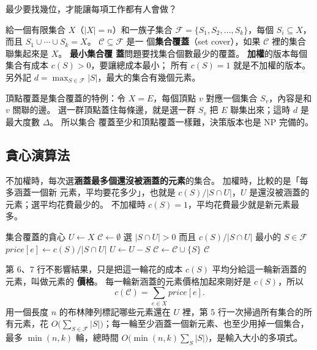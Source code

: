最少要找幾位，才能讓每項工作都有人會做？

\begin{definition}[集合覆蓋]
\label{def:apx-sc}
給一個有限集合 $X$（$|X| = n$）和一族子集合 $\mathcal{F} = \{S_1, S_2, \ldots, S_k\}$，每個
$S_i \subseteq X$，而且 $S_1 \cup \cdots \cup S_k = X$。 $\mathcal{C} \subseteq \mathcal{F}$ 是一
個\textbf{集合覆蓋}（set cover），如果 $\mathcal{C}$ 裡的集合聯集起來是 $X$。 \textbf{最小集合覆
蓋}問題要找集合個數最少的覆蓋。 \textbf{加權}的版本每個集合有成本 $c(S) > 0$，要讓總成本最小；
所有 $c(S) = 1$ 就是不加權的版本。 另外記 $d = \max_{S \in \mathcal{F}} |S|$，最大的集合有幾個元素。
\end{definition}

頂點覆蓋是集合覆蓋的特例：令 $X = E$，每個頂點 $v$ 對應一個集合 $S_v$，內容是和 $v$ 關聯的邊。
選一群頂點蓋住每條邊，就是選一群 $S_v$ 把 $E$ 聯集出來；這時 $d$ 是最大度數 $\Delta$。 所以集合
覆蓋至少和頂點覆蓋一樣難，決策版本也是 NP 完備的。

\subsection{貪心演算法}

不加權時，每次選\textbf{涵蓋最多個還沒被涵蓋的元素}的集合。 加權時，比較的是「每多涵蓋一個新
元素，平均要花多少」，也就是 $c(S) / |S \cap U|$，$U$ 是還沒被涵蓋的元素；選平均花費最少的。
不加權時 $c(S) = 1$，平均花費最少就是新元素最多。

\begin{pseudo}[label=alg:apx-sc]{集合覆蓋的貪心}
    \State $U \gets X$ 
    \State $\mathcal{C} \gets \emptyset$
        \State 選 $|S \cap U| > 0$ 而且 $c(S) / |S \cap U|$ 最小的 $S \in \mathcal{F}$ 
            \State $\mathit{price}[e] \gets c(S) / |S \cap U|$ 
        \EndFor
        \State $U \gets U - S$
        \State $\mathcal{C} \gets \mathcal{C} \cup \{S\}$
    \EndWhile
    \State \Return $\mathcal{C}$
\EndFunction
\end{pseudo}

第 6、7 行不影響結果，只是把這一輪花的成本 $c(S)$ 平均分給這一輪新涵蓋的元素，叫做元素的
\textbf{價格}。 每一輪新涵蓋的元素價格加起來剛好是 $c(S)$，所以
\begin{equation}
c(\mathcal{C}) = \sum_{e \in X} \mathit{price}[e].
\label{eq:apx-price}
\end{equation}
用一個長度 $n$ 的布林陣列標記哪些元素還在 $U$ 裡，第 5 行一次掃過所有集合的所有元素，花
$O\bigl(\sum_{S \in \mathcal{F}} |S|\bigr)$；每一輪至少涵蓋一個新元素、也至少用掉一個集合，最多
$\min(n, k)$ 輪，總時間 $O\bigl(\min(n, k) \sum_{S} |S|\bigr)$，是輸入大小的多項式。

